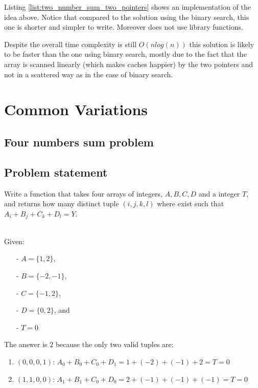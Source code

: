 Listing \ref{list:two_number_sum_two_pointers} shows an implementation of the idea above.  Notice that compared to the solution using the binary search, this one is shorter and simpler to write. Moreover does not use library functions. 



Despite the overall time complexity is still $O(n log(n))$ this solution is likely to be faster than
the one using binary search, mostly due to the fact that the array is scanned linearly (which makes caches happier) by the two pointers and not in a scattered way as in the case of binary search.

\section{Common Variations}
\subsection{Four numbers sum problem}
\label{sec:four_number}

\subsection{Problem statement}

\begin{exercise}
Write a function that takes four arrays of integers, $A,B,C,D$ and a integer $T$,
and returns how many distinct tuple $(i,j,k,l)$ where exist such that $A_i+B_j+C_k+D_l = Y$.

\begin{example}
\hfill \\
Given:
	\begin{itemize}
		\item[-] 	$A=\{1,2\}$,
		\item[-] 	$B=\{-2,-1\}$,
		\item[-] 	$C=\{-1,2\}$,
		\item[-]	$D=\{0,2\}$, and 
		\item[-] 	$T = 0$
	\end{itemize}
The answer is $2$ because the only two valid tuples are:
\begin{enumerate}
	\item $(0,0,0,1)$: $A_0 + B_0 + C_0 + D_1 = 1 + (-2) + (-1) + 2 = T = 0$
	\item $(1,1,0,0)$: $A_1 + B_1 + C_0 + D_0 = 2 + (-1) + (-1) + (-1) = T = 0$
\end{enumerate}
\end{example}
\end{exercise}


